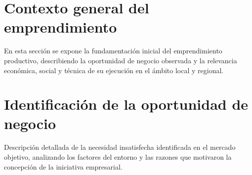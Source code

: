 \section{Contexto general del emprendimiento}
\label{sec:contexto_general}

En esta sección se expone la fundamentación inicial del emprendimiento productivo, describiendo la oportunidad de negocio observada y la relevancia económica, social y técnica de su ejecución en el ámbito local y regional.

\section{Identificación de la oportunidad de negocio}
\label{sec:oportunidad_negocio}

Descripción detallada de la necesidad insatisfecha identificada en el mercado objetivo, analizando los factores del entorno y las razones que motivaron la concepción de la iniciativa empresarial.

